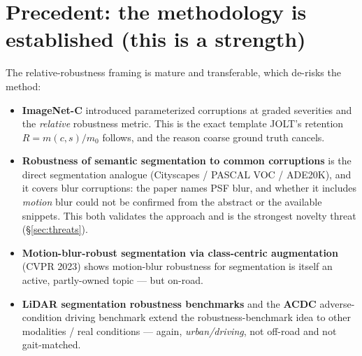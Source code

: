 \documentclass[11pt]{article}
\begin{document}
\section{Precedent: the methodology is established (this is a strength)}
\label{sec:precedent}
The relative-robustness framing is mature and transferable, which de-risks the method:
\begin{itemize}[noitemsep]
  \item \textbf{ImageNet-C} \cite{imagenetc} introduced parameterized corruptions at
        graded severities and the \emph{relative} robustness metric. This is the exact
        template JOLT's retention $R = m(c,s)/m_0$ follows, and the reason coarse
        ground truth cancels.
  \item \textbf{Robustness of semantic segmentation to common corruptions}
        \cite{kamann} is the direct segmentation analogue (Cityscapes / PASCAL VOC /
        ADE20K), and it covers blur corruptions: the paper names PSF blur, and whether it
        includes \emph{motion} blur could not be confirmed from the abstract or the
        available snippets. This both validates the approach and is the strongest novelty
        threat (\S\ref{sec:threats}).
  \item \textbf{Motion-blur-robust segmentation via class-centric augmentation}
        \cite{classcentric} (CVPR 2023) shows motion-blur robustness for segmentation
        is itself an active, partly-owned topic --- but on-road.
  \item \textbf{LiDAR segmentation robustness benchmarks} \cite{robo3d} and the
        \textbf{ACDC} adverse-condition driving benchmark \cite{acdc} extend the
        robustness-benchmark idea to other modalities / real conditions --- again,
        \emph{urban/driving}, not off-road and not gait-matched.
\end{itemize}
\end{document}
